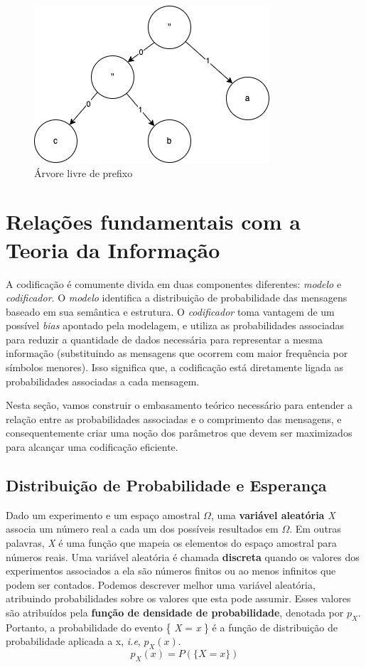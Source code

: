 \begin{figure}[h]
   \centering
   \includegraphics[scale=0.75]{figs/prefixtree.png}
    \caption{Árvore livre de prefixo}
    \label{fig:prefixt}
 \end{figure}
\section{Relações fundamentais com a Teoria da Informação}
A codificação é comumente divida em duas componentes diferentes: \emph{modelo} e \emph{codificador}. 
O \emph{modelo} identifica a distribuição de probabilidade das mensagens baseado em sua semântica e estrutura. 
O \emph{codificador} toma vantagem de um possível \emph{bias} apontado pela modelagem, e utiliza as probabilidades associadas para reduzir a quantidade de dados necessária para representar a mesma informação (substituindo as mensagens que ocorrem com maior frequência por símbolos menores).
Isso significa que, a codificação está diretamente ligada as probabilidades associadas a cada mensagem.

Nesta seção, vamos construir o embasamento teórico necessário para entender a relação entre as probabilidades associadas e o comprimento das mensagens, e consequentemente criar uma noção dos parâmetros que devem ser maximizados para alcançar uma codificação eficiente.

\subsection{Distribuição de Probabilidade e Esperança}
Dado um experimento e um espaço amostral $\Omega$, uma \textbf{variável aleatória} \emph{X} associa um número real a cada um dos possíveis resultados em $\Omega$. Em outras palavras, \emph{X} é uma função que mapeia os elementos do espaço amostral para números reais. Uma variável aleatória é chamada \textbf{discreta} quando os valores dos experimentos associados a ela são números finitos ou ao menos infinitos que podem ser contados.
Podemos descrever melhor uma variável aleatória, atribuindo probabilidades sobre os valores que esta pode assumir. Esses valores são atribuídos pela \textbf{função de densidade de probabilidade}, denotada por \emph{$p_X$}. Portanto, a probabilidade do evento \{ \emph{X} = \emph{x} \} é a função de distribuição de probabilidade aplicada a x, \emph{i.e}, \emph{$p_X(x)$}.
\begin{equation} \label{eq:dist_prob_def}
p_X(x) = P(\{X = x\})
\end{equation}

